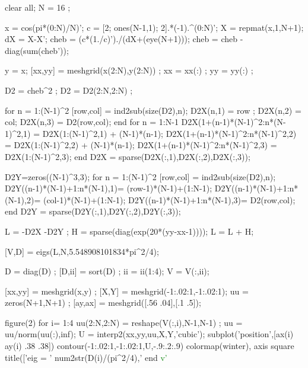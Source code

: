 \documentclass[ border=0pt, a4paper, 11pt]{article}
\numberwithin{equation}{section}
\renewcommand{\v}{\textcolor{green}{v'}}
\begin{document}
clear all;
N = 16 ;

x = cos(pi*(0:N)/N)';
c = [2; ones(N-1,1); 2].*(-1).^(0:N)';
X = repmat(x,1,N+1);
dX = X-X';
cheb  = (c*(1./c)')./(dX+(eye(N+1)));      %
cheb  = cheb - diag(sum(cheb'));

y = x;
[xx,yy] = meshgrid(x(2:N),y(2:N)) ;
xx = xx(:) ; yy = yy(:) ;

D2 = cheb^2 ; D2 = D2(2:N,2:N) ;

    for n = 1:(N-1)^2
            [row,col] = ind2sub(size(D2),n);
            D2X(n,1) = row ;
            D2X(n,2) = col;
            D2X(n,3) = D2(row,col);
    end
 for n = 1:N-1 
    D2X(1+(n-1)*(N-1)^2:n*(N-1)^2,1) = D2X(1:(N-1)^2,1) + (N-1)*(n-1);
    D2X(1+(n-1)*(N-1)^2:n*(N-1)^2,2) = D2X(1:(N-1)^2,2) + (N-1)*(n-1);
    D2X(1+(n-1)*(N-1)^2:n*(N-1)^2,3) = D2X(1:(N-1)^2,3); 
 end 
 D2X = sparse(D2X(:,1),D2X(:,2),D2X(:,3));  

   D2Y=zeros((N-1)^3,3);
    for n = 1:(N-1)^2
    [row,col] = ind2sub(size(D2),n);        
    D2Y((n-1)*(N-1)+1:n*(N-1),1)= (row-1)*(N-1)+(1:N-1);
    D2Y((n-1)*(N-1)+1:n*(N-1),2)= (col-1)*(N-1)+(1:N-1);
    D2Y((n-1)*(N-1)+1:n*(N-1),3)= D2(row,col);
    end
    D2Y = sparse(D2Y(:,1),D2Y(:,2),D2Y(:,3));
    
    L = -D2X -D2Y ; 
    H = sparse(diag(exp(20*(yy-xx-1))));
    L = L + H;
    
    [V,D] = eigs(L,N,5.548908101834*pi^2/4); 
    
    D = diag(D) ;
    [D,ii] = sort(D) ;
    ii = ii(1:4); 
    V = V(:,ii);
    
    [xx,yy] = meshgrid(x,y) ;
    [X,Y] = meshgrid(-1:.02:1,-1:.02:1);
    uu = zeros(N+1,N+1) ;
    [ay,ax] = meshgrid([.56 .04],[.1 .5]);

    figure(2)
    for i= 1:4
        uu(2:N,2:N) = reshape(V(:,i),N-1,N-1) ;
        uu = uu/norm(uu(:),inf);
        U = interp2(xx,yy,uu,X,Y,'cubic');
        subplot('position',[ax(i) ay(i) .38 .38])
        contour(-1:.02:1,-1:.02:1,U,-.9:.2:.9) %
        colormap(winter), axis square
        title(['eig = ' num2str(D(i)/(pi^2/4),'%
    end
    \v
\end{document}
